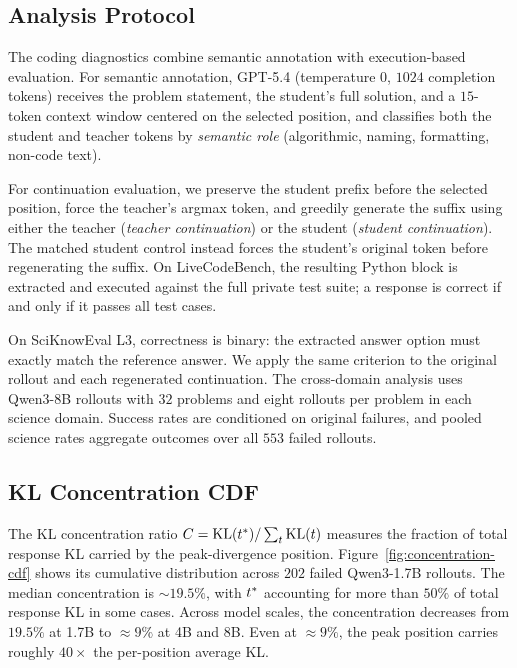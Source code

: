 \subsection{Analysis Protocol}
\label{app:eval}

The coding diagnostics combine semantic annotation with execution-based evaluation. For semantic annotation, GPT-5.4 (temperature $0$, $1024$ completion tokens) receives the problem statement, the student's full solution, and a $15$-token context window centered on the selected position, and classifies both the student and teacher tokens by \emph{semantic role} (algorithmic, naming, formatting, non-code text).

For continuation evaluation, we preserve the student prefix before the selected position, force the teacher's argmax token, and greedily generate the suffix using either the teacher (\emph{teacher continuation}) or the student (\emph{student continuation}). The matched student control instead forces the student's original token before regenerating the suffix. On LiveCodeBench, the resulting Python block is extracted and executed against the full private test suite; a response is correct if and only if it passes all test cases.

On SciKnowEval L3, correctness is binary: the extracted answer option must exactly match the reference answer. We apply the same criterion to the original rollout and each regenerated continuation. The cross-domain analysis uses Qwen3-8B rollouts with $32$ problems and eight rollouts per problem in each science domain. Success rates are conditioned on original failures, and pooled science rates aggregate outcomes over all $553$ failed rollouts.

\subsection{KL Concentration CDF}
\label{app:kl-conc}

The KL concentration ratio $C = \mathrm{KL}(t^{*})/\sum_t \mathrm{KL}(t)$ measures the fraction of total response KL carried by the peak-divergence position. Figure~\ref{fig:concentration-cdf} shows its cumulative distribution across $202$ failed Qwen3-1.7B rollouts. The median concentration is ${\sim}19.5\%$, with $t^{*}$ accounting for more than $50\%$ of total response KL in some cases. Across model scales, the concentration decreases from $19.5\%$ at 1.7B to ${\approx}9\%$ at 4B and 8B. Even at ${\approx}9\%$, the peak position carries roughly $40\times$ the per-position average KL.

